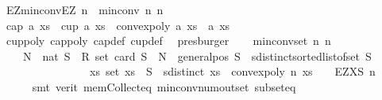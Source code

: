 \begin{isabellebody}
\isamarkupfalse%
%
\endisatagproof
{\isafoldproof}%
%
\isadelimproof
\isanewline
%
\endisadelimproof
\isanewline
{}\isamarkupfalse%
\ EZ{\isacharunderscore}{\kern0pt}min{\isacharunderscore}{\kern0pt}conv{\isacharcolon}{\kern0pt}{\isachardoublequoteopen}EZ\ n\ {\isasymle}\ min{\isacharunderscore}{\kern0pt}conv\ n\ n{\isachardoublequoteclose}\isanewline
%
\isadelimproof
%
\endisadelimproof
%
\isatagproof
{}\isamarkupfalse%
{\isacharminus}{\kern0pt}\isanewline
\ \ \isamarkupfalse%
\ {\isachardoublequoteopen}cap\ a\ xs\ {\isasymor}\ cup\ a\ xs\ {\isasymlongrightarrow}\ convex{\isacharunderscore}{\kern0pt}poly\ a\ xs{\isachardoublequoteclose}\ \ a\ xs\ \isanewline
\ \ \ \ \isamarkupfalse%
\ cup{\isacharunderscore}{\kern0pt}poly\ cap{\isacharunderscore}{\kern0pt}poly\ cap{\isacharunderscore}{\kern0pt}def\ cup{\isacharunderscore}{\kern0pt}def\ \isamarkupfalse%
\ presburger\isanewline
\ \ \isamarkupfalse%
\ {\isachardoublequoteopen}min{\isacharunderscore}{\kern0pt}conv{\isacharunderscore}{\kern0pt}set\ n\ n\ {\isasymsubseteq}\isanewline
\ \ \ \ {\isacharbraceleft}{\kern0pt}N\ {\isacharcolon}{\kern0pt}{\isacharcolon}{\kern0pt}\ nat{\isachardot}{\kern0pt}\ {\isacharparenleft}{\kern0pt}{\isasymforall}S\ {\isacharcolon}{\kern0pt}{\isacharcolon}{\kern0pt}\ R{}\ set{\isachardot}{\kern0pt}\ {\isacharparenleft}{\kern0pt}card\ S\ {\isasymge}\ N\ {\isasymand}\ general{\isacharunderscore}{\kern0pt}pos\ S\ {\isasymand}\ sdistinct{\isacharparenleft}{\kern0pt}sorted{\isacharunderscore}{\kern0pt}list{\isacharunderscore}{\kern0pt}of{\isacharunderscore}{\kern0pt}set\ S{\isacharparenright}{\kern0pt}{\isacharparenright}{\kern0pt}\isanewline
\ \ \ \ \ \ \ \ \ \ \ \ \ \ \ {\isasymlongrightarrow}\ {\isacharparenleft}{\kern0pt}{\isasymexists}xs{\isachardot}{\kern0pt}\ set\ xs\ {\isasymsubseteq}\ S\ {\isasymand}\ sdistinct\ xs\ {\isasymand}\ convex{\isacharunderscore}{\kern0pt}poly\ n\ xs{\isacharparenright}{\kern0pt}{\isacharparenright}{\kern0pt}{\isacharbraceright}{\kern0pt}{\isachardoublequoteclose}\ {\isacharparenleft}{\kern0pt}\ {\isachardoublequoteopen}{\isacharunderscore}{\kern0pt}\ {\isasymsubseteq}\ {\isacharquery}{\kern0pt}EZXS\ n{\isachardoublequoteclose}{\isacharparenright}{\kern0pt}\isanewline
\ \ \ \ \isamarkupfalse%
\ {\isacharparenleft}{\kern0pt}smt\ {\isacharparenleft}{\kern0pt}verit{\isacharparenright}{\kern0pt}\ mem{\isacharunderscore}{\kern0pt}Collect{\isacharunderscore}{\kern0pt}eq\ min{\isacharunderscore}{\kern0pt}conv{\isacharunderscore}{\kern0pt}num{\isacharunderscore}{\kern0pt}out{\isacharunderscore}{\kern0pt}set\ subset{\isacharunderscore}{\kern0pt}eq{\isacharparenright}{\kern0pt}\isanewline

\end{isabellebody}
